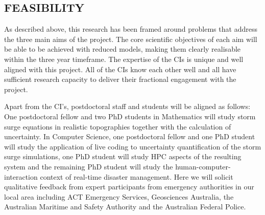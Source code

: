 \iffalse
\subsection*{RESEARCH ENVIRONMENT}
\fi

\subsection*{FEASIBILITY}

\iffalse The project is feasible due to the rigorous design with distinct tasks
and timelines which address the identified, well understood challenges
in this discipline. 
\fi

\iffalse
The project brings together a multi-disciplinary
team of experts in mathematics, software engineering, human computer interaction and high
performance computing.
\fi

As described above, this research has been framed around problems that address the three main aims of the project. The core scientific objectives of each aim will be able to be achieved with reduced models, making them clearly realisable within the three year timeframe.
The expertise of the CIs is unique and well aligned with this project. All of the CIs know each other well and all have sufficient research capacity to deliver their fractional engagement with the project.

Apart from the CI's, postdoctoral staff and students will be aligned as follows: One postdoctoral fellow and two PhD students in 
Mathematics will study storm surge equations in realistic topographies together with the calculation of uncertainty. 
In Computer Science, one postdoctoral fellow 
and one PhD student will study the application of live coding to uncertainty quantification of the storm surge simulations,
one PhD student will study HPC aspects of the resulting system
 and the remaining PhD student will study the human-computer-interaction context of real-time disaster management. 
Here we will solicit qualitative feedback from expert participants from
emergency authorities in our local area including ACT Emergency
Services, Geosciences Australia, the Australian Maritime and Safety
Authority and the Australian Federal Police.

